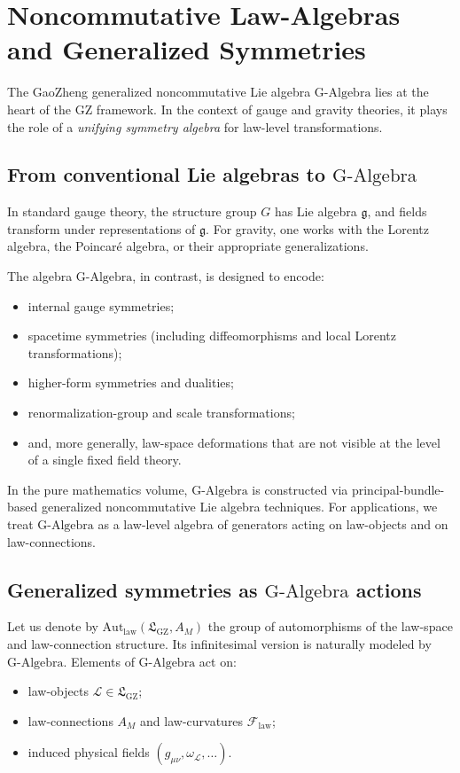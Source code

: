 \documentclass[11pt]{book}
\newcommand{\GAlgebra}{\text{G-Algebra}}
\newcommand{\GZLS}{\ensuremath{\mathfrak{L}_{\mathrm{GZ}}}}
\newcommand{\GZLOC}{\ensuremath{A_M}}
\newcommand{\GZLCurv}{\ensuremath{\mathcal{F}_{\mathrm{law}}}}
\newcommand{\Group}{\ensuremath{G}}
\newcommand{\Conn}{\ensuremath{\omega}}
\theoremstyle{plain}
\theoremstyle{definition}
\theoremstyle{remark}
\begin{document}
\section{Noncommutative Law-Algebras and Generalized Symmetries}
\label{sec:noncomm-law-algebras}



The GaoZheng generalized noncommutative Lie algebra $\GAlgebra$ lies at
the heart of the GZ framework. In the context of gauge and gravity
theories, it plays the role of a \emph{unifying symmetry algebra} for
law-level transformations.

\subsection{From conventional Lie algebras to \texorpdfstring{$\GAlgebra$}{G-Algebra}}

In standard gauge theory, the structure group $\Group$ has Lie algebra
$\mathfrak{g}$, and fields transform under representations of
$\mathfrak{g}$. For gravity, one works with the Lorentz algebra, the
Poincar\'e algebra, or their appropriate generalizations.

The algebra $\GAlgebra$, in contrast, is designed to encode:
\begin{itemize}
  \item internal gauge symmetries;
  \item spacetime symmetries (including diffeomorphisms and local
        Lorentz transformations);
  \item higher-form symmetries and dualities;
  \item renormalization-group and scale transformations;
  \item and, more generally, law-space deformations that are not
        visible at the level of a single fixed field theory.
\end{itemize}

In the pure mathematics volume, $\GAlgebra$ is constructed via
principal-bundle-based generalized noncommutative Lie algebra
techniques. For applications, we treat $\GAlgebra$ as a law-level
algebra of generators acting on law-objects and on law-connections.

\subsection{Generalized symmetries as \texorpdfstring{$\GAlgebra$}{G-Algebra} actions}

Let us denote by $\mathrm{Aut}_{\mathrm{law}}(\GZLS,\GZLOC)$ the group
of automorphisms of the law-space and law-connection structure. Its
infinitesimal version is naturally modeled by $\GAlgebra$. Elements of
$\GAlgebra$ act on:
\begin{itemize}
  \item law-objects $\mathcal{L} \in \GZLS$;
  \item law-connections $\GZLOC$ and law-curvatures $\GZLCurv$;
  \item induced physical fields $(g_{\mu\nu},\Conn_{\mathcal{L}},\dots)$.
\end{itemize}
\end{document}

